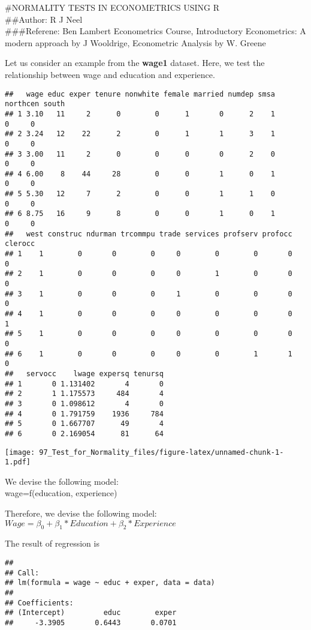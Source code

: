 \documentclass[
]{article}
\author{}
\date{\vspace{-2.5em}}
\begin{document}
\#NORMALITY TESTS IN ECONOMETRICS USING R\\
\#\#Author: R J Neel\\
\#\#\#Referene: Ben Lambert Econometrics Course, Introductory
Econometrics: A modern approach by J Wooldrige, Econometric Analysis by
W. Greene

Let us consider an example from the \textbf{wage1} dataset. Here, we
test the relationship between wage and education and experience.

\begin{verbatim}
##   wage educ exper tenure nonwhite female married numdep smsa northcen south
## 1 3.10   11     2      0        0      1       0      2    1        0     0
## 2 3.24   12    22      2        0      1       1      3    1        0     0
## 3 3.00   11     2      0        0      0       0      2    0        0     0
## 4 6.00    8    44     28        0      0       1      0    1        0     0
## 5 5.30   12     7      2        0      0       1      1    0        0     0
## 6 8.75   16     9      8        0      0       1      0    1        0     0
##   west construc ndurman trcommpu trade services profserv profocc clerocc
## 1    1        0       0        0     0        0        0       0       0
## 2    1        0       0        0     0        1        0       0       0
## 3    1        0       0        0     1        0        0       0       0
## 4    1        0       0        0     0        0        0       0       1
## 5    1        0       0        0     0        0        0       0       0
## 6    1        0       0        0     0        0        1       1       0
##   servocc    lwage expersq tenursq
## 1       0 1.131402       4       0
## 2       1 1.175573     484       4
## 3       0 1.098612       4       0
## 4       0 1.791759    1936     784
## 5       0 1.667707      49       4
## 6       0 2.169054      81      64
\end{verbatim}

\texttt{[image: 97\_Test\_for\_Normality\_files/figure-latex/unnamed-chunk-1-1.pdf]}

We devise the following model:\\
wage=f(education, experience)

Therefore, we devise the following model:\\
\(Wage=\beta_0 + \beta_1*Education +\beta_2*Experience\)

The result of regression is

\begin{verbatim}
## 
## Call:
## lm(formula = wage ~ educ + exper, data = data)
## 
## Coefficients:
## (Intercept)         educ        exper  
##     -3.3905       0.6443       0.0701
\end{verbatim}
\end{document}
